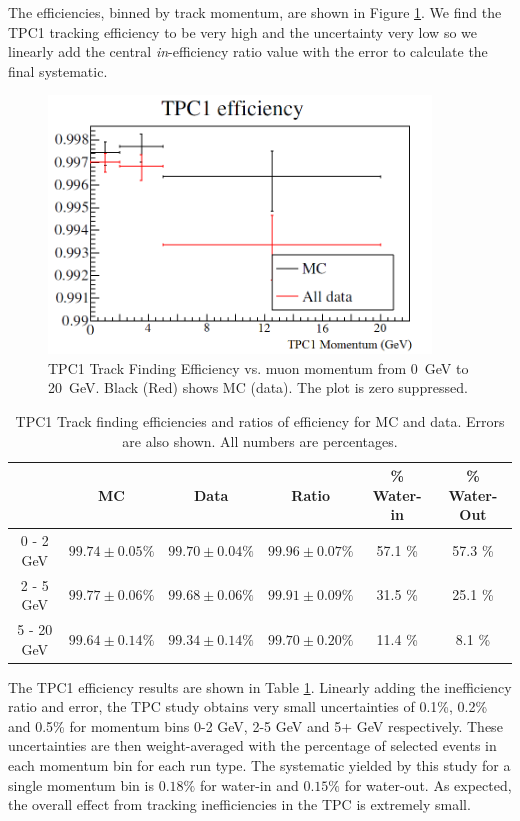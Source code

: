 The efficiencies, binned by track momentum, are shown in Figure \ref{fig:tpc1eff}. We find the TPC1 tracking efficiency to be very high and the uncertainty very low so we linearly add the central \textit{in}-efficiency ratio value with the error to calculate the final systematic. 

\begin{figure}[h]
\centering
\includegraphics[width=4in]{Figures/tpc1matcheff.png}
\caption{TPC1 Track Finding Efficiency vs. muon momentum from 0~GeV to 20~GeV. Black (Red) shows MC (data). The plot is zero suppressed.}
\label{fig:tpc1eff}
\end{figure}

\begin{table}[h]
\caption{TPC1 Track finding efficiencies and ratios of efficiency for MC and data. Errors are also shown. All numbers are percentages.}
\label{tab:tpc1eff}
\centering
\begin{tabular}{cccccc}\toprule
& MC & Data & Ratio & \% Water-in & \% Water-Out \\ \midrule
0 - 2 GeV & $99.74 \pm 0.05 \%$ & $99.70 \pm 0.04 \%$ & $99.96 \pm 0.07 \%$ & 57.1 \% & 57.3 \% \\
2 - 5 GeV & $99.77 \pm 0.06 \%$ & $99.68 \pm 0.06 \%$ & $99.91 \pm 0.09 \%$ & 31.5 \% & 25.1 \% \\
5 - 20 GeV & $99.64 \pm 0.14 \%$ & $99.34 \pm 0.14 \%$ & $99.70 \pm 0.20 \%$ & 11.4 \% & 8.1 \%\\
\bottomrule
\end{tabular}
\end{table}

The TPC1 efficiency results are shown in Table \ref{tab:tpc1eff}. Linearly adding the inefficiency ratio and error, 
the TPC study obtains very small uncertainties of 0.1\%, 0.2\% and 0.5\% 
for momentum bins 0-2 GeV, 2-5 GeV and 5+ GeV respectively. 
These uncertainties are then weight-averaged with the percentage 
of selected events in each momentum bin for each run type. 
The systematic yielded by this study for a single momentum bin is $0.18 \%$ for water-in and $0.15 \%$ for water-out. 
As expected, the overall effect from tracking inefficiencies 
in the TPC is extremely small.

